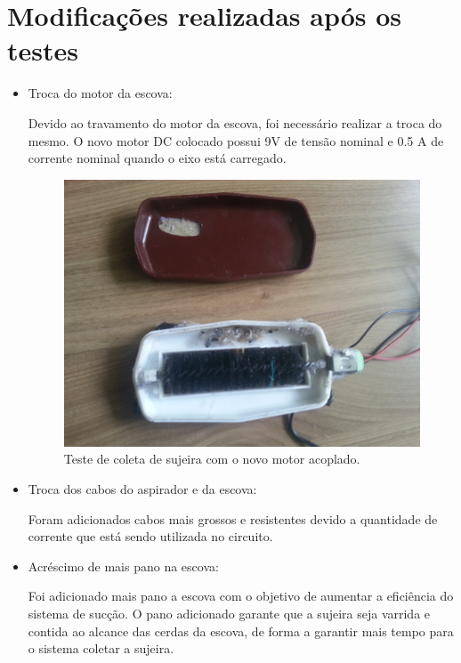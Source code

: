    \section{Modificações realizadas após os testes}
   \label{sub:mudanças}
   \begin{itemize}
      \item Troca do motor da escova:

         Devido ao travamento do motor da escova, foi necessário realizar a troca do mesmo. O novo motor DC colocado possui 9V de tensão nominal e 0.5 A de corrente nominal quando o eixo está carregado.

         \begin{figure}[H]                                                           
            \centering                                                                
            \includegraphics[scale=0.1]{figuras/SuccaoPC3_1.jpg}               
            \caption{Teste de coleta de sujeira com o novo motor acoplado.}    
            \label{img:teste_coleta}                                            
         \end{figure} 

      \item Troca dos cabos do aspirador e da escova:

         Foram adicionados cabos mais grossos e resistentes devido a quantidade de corrente que está sendo utilizada no circuito. 

      \item Acréscimo de mais pano na escova:

         Foi adicionado mais pano a escova com o objetivo de aumentar a eficiência do sistema de sucção. O pano adicionado garante que a sujeira seja varrida e contida ao alcance das cerdas da escova, de forma a garantir mais tempo para o sistema coletar a sujeira.


\end{itemize}
